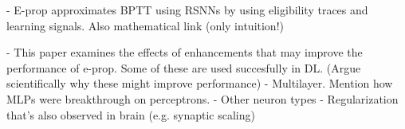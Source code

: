 \begin{tcolorbox}[colback=orange]

- E-prop approximates BPTT using RSNNs by using eligibility traces and learning signals. Also mathematical link (only intuition!)

\vspace{8cm}

\end{tcolorbox}

\begin{tcolorbox}[colback=orange]

- This paper examines the effects of enhancements that may improve the performance of e-prop. Some of these are used succesfully in DL. (Argue scientifically why these might improve performance)
    - Multilayer. Mention how MLPs were breakthrough on perceptrons.
    - Other neuron types
    - Regularization that's also observed in brain (e.g. synaptic scaling)

\vspace{8cm}

\end{tcolorbox}
